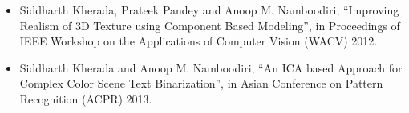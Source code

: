 \begin{itemize}
 \item Siddharth Kherada, Prateek Pandey and Anoop M. Namboodiri, ``Improving Realism of 3D Texture 
using Component Based Modeling'', in Proceedings of IEEE Workshop on the Applications of Computer Vision (WACV) 2012.
\item Siddharth Kherada and Anoop M. Namboodiri, ``An ICA based Approach for Complex Color Scene
Text Binarization'', in Asian Conference on Pattern Recognition (ACPR) 2013.\\
\end{itemize}



